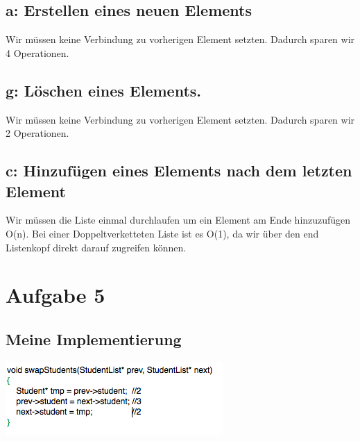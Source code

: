 \documentclass{article}
\begin{document}
\subsection{a: Erstellen eines neuen Elements}
Wir müssen keine Verbindung zu vorherigen Element setzten.
Dadurch sparen wir 4 Operationen.

\subsection{g: L{\"o}schen eines Elements.}
Wir müssen keine Verbindung zu vorherigen Element setzten.
Dadurch sparen wir 2 Operationen.

\subsection{c: Hinzuf{\"u}gen eines Elements nach dem letzten Element}
Wir müssen die Liste einmal durchlaufen um ein Element am Ende hinzuzufügen O(n).
Bei einer Doppeltverketteten Liste ist es O(1), da wir über den end Listenkopf direkt darauf zugreifen können.

\section{Aufgabe 5}

\subsection{ Meine Implementierung }

\includegraphics{swapstudents}
\end{document}

